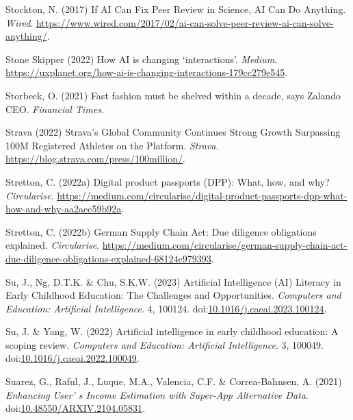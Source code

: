 \documentclass[
  letterpaper,
  DIV=11,
  numbers=noendperiod]{scrartcl}
\newlength{\cslhangindent}
\newenvironment{CSLReferences}[2] %
 {\begin{list}{}{%
  \setlength{\itemindent}{0pt}
  \setlength{\leftmargin}{0pt}
  \setlength{\parsep}{0pt}
  \ifodd #1
   \setlength{\leftmargin}{\cslhangindent}
   \setlength{\itemindent}{-1\cslhangindent}
  \fi
  \setlength{\itemsep}{#2\baselineskip}}}
 {\end{list}}
\begin{document}
\begin{CSLReferences}{0}{1}
Stockton, N. (2017) If {AI Can Fix Peer Review} in {Science}, {AI Can Do
Anything}. \emph{Wired}.
\url{https://www.wired.com/2017/02/ai-can-solve-peer-review-ai-can-solve-anything/}.

Stone Skipper (2022) How {AI} is changing {`interactions'}.
\emph{Medium}.
\url{https://uxplanet.org/how-ai-is-changing-interactions-179cc279e545}.

Storbeck, O. (2021) Fast fashion must be shelved within a decade, says
{Zalando CEO}. \emph{Financial Times}.

Strava (2022) Strava's {Global Community Continues Strong Growth
Surpassing 100M Registered Athletes} on the {Platform}. \emph{Strava}.
\url{https://blog.strava.com/press/100million/}.

Stretton, C. (2022a) Digital product passports ({DPP}): What, how, and
why? \emph{Circularise}.
\url{https://medium.com/circularise/digital-product-passports-dpp-what-how-and-why-aa2aec59b92a}.

Stretton, C. (2022b) German {Supply Chain Act}: {Due} diligence
obligations explained. \emph{Circularise}.
\url{https://medium.com/circularise/german-supply-chain-act-due-diligence-obligations-explained-68124c979393}.

Su, J., Ng, D.T.K. \& Chu, S.K.W. (2023) Artificial {Intelligence}
({AI}) {Literacy} in {Early Childhood Education}: {The Challenges} and
{Opportunities}. \emph{Computers and Education: Artificial
Intelligence}. 4, 100124.
doi:\href{https://doi.org/10.1016/j.caeai.2023.100124}{10.1016/j.caeai.2023.100124}.

Su, J. \& Yang, W. (2022) Artificial intelligence in early childhood
education: {A} scoping review. \emph{Computers and Education: Artificial
Intelligence}. 3, 100049.
doi:\href{https://doi.org/10.1016/j.caeai.2022.100049}{10.1016/j.caeai.2022.100049}.

Suarez, G., Raful, J., Luque, M.A., Valencia, C.F. \& Correa-Bahnsen, A.
(2021) \emph{Enhancing {User}' s {Income Estimation} with {Super-App
Alternative Data}}.
doi:\href{https://doi.org/10.48550/ARXIV.2104.05831}{10.48550/ARXIV.2104.05831}.


\end{CSLReferences}
\end{document}

